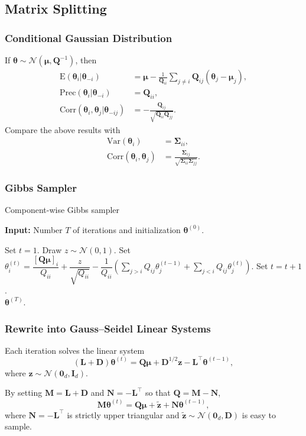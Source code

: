 \documentclass[aspectratio=169]{beamer}
\newcommand{\B}[1]{\mathbf{#1}} %
\newcommand{\Bs}[1]{\boldsymbol{#1}} %
\newcommand{\pr}[1]{\left(#1\right)} %
\begin{document}
\subsection{Matrix Splitting}
\begin{frame}
\frametitle{Conditional Gaussian Distribution}
If $\Bs{\theta} \sim \mathcal{N}(\Bs{\mu},\B{Q}^{-1})$, then
\[
\begin{aligned}
\text{E}(\Bs{\theta}_i | \Bs{\theta}_{-i}) &= \Bs{\mu} - \frac{1}{\B{Q}_{ii} }\sum_{j\ne i} \B{Q}_{ij} (\Bs{\theta}_j - \Bs{\mu}_j), \\
\text{Prec}(\Bs{\theta}_i | \Bs{\theta}_{-i}) &= \B{Q}_{ii}, \\
\text{Corr}(\Bs{\theta}_i, \Bs{\theta}_j | \Bs{\theta}_{-ij}) &= -\frac{\B{Q}_{ij}}{\sqrt{\B{Q}_{ii}\B{Q}_{jj}}}.
\end{aligned}
\]
Compare the above results with
\[
\begin{aligned}
\text{Var}(\Bs{\theta}_i) &= \Bs{\Sigma}_{ii}, \\
\text{Corr}(\Bs{\theta}_i, \Bs{\theta}_j) &= \frac{\Bs{\Sigma}_{ij}}{\sqrt{\Bs{\Sigma}_{ii}\Bs{\Sigma}_{jj}}}.
\end{aligned}
\]
\end{frame}

\begin{frame}
\frametitle{Gibbs Sampler}
\begin{algorithm}[H]
\caption{Component-wise Gibbs sampler}
\label{algo:component_wise_Gibbs}
\hspace*{\algorithmicindent} \textbf{Input:} Number $T$ of iterations and initialization $\Bs{\theta}^{(0)}$.
\begin{algorithmic}[1]
\State Set $t = 1$.
    \State Draw $z \sim \mathcal{N}(0,1)$.
    \State Set $\theta^{(t)}_i = \dfrac{[\B{Q}\Bs{\mu}]_i}{Q_{ii}} + \dfrac{z}{\sqrt{Q_{ii}}} - \dfrac{1}{Q_{ii}}\pr{\displaystyle\sum_{j > i}Q_{ij}\theta_j^{(t-1)} + \displaystyle\sum_{j < i}Q_{ij}\theta_j^{(t)}}$.
    \EndFor
    \State Set $t = t + 1$.
\EndWhile\\
\Return $\Bs{\theta}^{(T)}$.
\end{algorithmic}
\end{algorithm}
\end{frame}

\begin{frame}
\frametitle{Rewrite into Gauss--Seidel Linear Systems}
Each iteration solves the linear system
\[(\B{L} + \B{D})\Bs{\theta}^{(t)} = \B{Q}\Bs{\mu} + \B{D}^{1/2}\B{z} - \B{L}^{\top}\Bs{\theta}^{(t-1)},\]
where $\B{z} \sim \mathcal{N}(\B{0}_d,\B{I}_d)$.

By setting $\B{M} = \B{L}+\B{D}$ and $\B{N} = -\B{L}^{\top}$ so that $\B{Q} = \B{M} - \B{N}$,
\[
  \B{M}\Bs{\theta}^{(t)} = \B{Q}\Bs{\mu} +  \tilde{\B{z}}+\B{N}\Bs{\theta}^{(t-1)},
\]
where $\B{N} = -\B{L}^{\top}$ is strictly upper triangular and $\tilde{\B{z}} \sim \mathcal{N}(\B{0}_d,\B{D})$ is easy to sample.
\end{frame}
\end{document}
